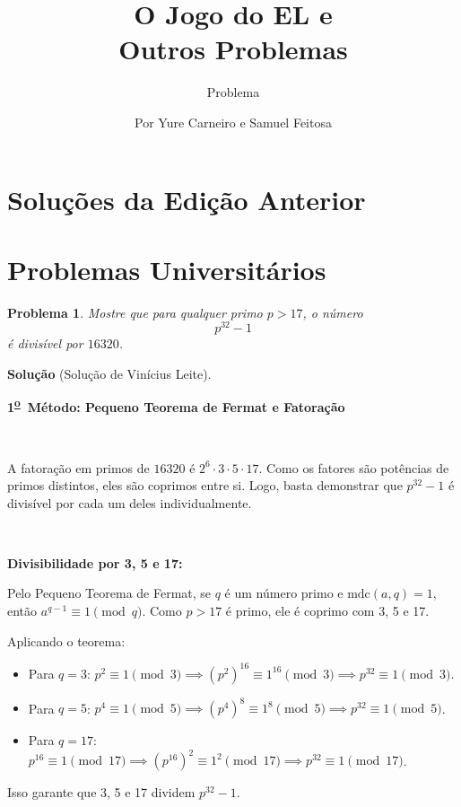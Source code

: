 \documentclass{hipatia}
\subtitle{Problema}
\title{O Jogo do EL e\\Outros Problemas}
\author{ Por Yure Carneiro e Samuel Feitosa}
\newcommand{\superou}{\textsuperscript{\underline{o}}~}
\newtheorem{problem*}{Problema}
\begin{document}
\setcounter{page}{\problemapage}

\maketitle



\section{Soluções da Edição Anterior}

\section{Problemas Universitários}

\begin{problem*} Mostre que para qualquer primo $p > 17$, o número $$p^{32} - 1$$ é divisível por $16320$.
\end{problem*}

\noindent \textbf{Solução} (Solução de Vinícius Leite).

\textbf{1\superou Método: Pequeno Teorema de Fermat e Fatoração}

\

A fatoração em primos de $16320$ é $2^6 \cdot 3 \cdot 5 \cdot 17$. Como os fatores são potências de primos distintos, eles são coprimos entre si. Logo, basta demonstrar que $p^{32}-1$ é divisível por cada um deles individualmente.

\ 

\textbf{Divisibilidade por 3, 5 e 17:}

Pelo Pequeno Teorema de Fermat, se $q$ é um número primo e $\text{mdc}(a,q)=1$, então $a^{q-1} \equiv 1 \pmod q$. Como $p > 17$ é primo, ele é coprimo com 3, 5 e 17.

Aplicando o teorema:
\begin{itemize}\setlength{\itemsep}{0.5em}
    \item Para $q=3$: $p^2 \equiv 1 \pmod 3 \implies (p^2)^{16} \equiv 1^{16} \pmod 3 \implies p^{32} \equiv 1 \pmod 3$.
    \item Para $q=5$: $p^4 \equiv 1 \pmod 5 \implies (p^4)^8 \equiv 1^8 \pmod 5 \implies p^{32} \equiv 1 \pmod 5$.
    \item Para $q=17$: $p^{16} \equiv 1 \pmod{17} \implies (p^{16})^2 \equiv 1^2 \pmod{17} \implies p^{32} \equiv 1 \pmod{17}$.
\end{itemize}

Isso garante que 3, 5 e 17 dividem $p^{32}-1$.
\end{document}
